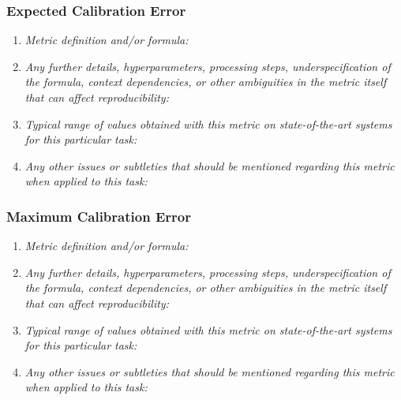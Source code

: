 \documentclass[a4paper,11pt]{article}
\begin{document}
        \subsubsection{Expected Calibration Error}
            \begin{enumerate}[label=\alph*.]
                \item \textit{Metric definition and/or formula:}
                \bigskip
                \item \textit{Any further details, hyperparameters, processing steps, underspecification of the formula, context dependencies, or other ambiguities in the metric itself that can affect reproducibility:}
                \bigskip
                \item \textit{Typical range of values obtained with this metric on state-of-the-art systems for this particular task:}
                \bigskip
                \item \textit{Any other issues or subtleties that should be mentioned regarding this metric when applied to this task:}
                \bigskip
            \end{enumerate}
        \subsubsection{Maximum Calibration Error}
            \begin{enumerate}[label=\alph*.]
                \item \textit{Metric definition and/or formula:}
                \bigskip
                \item \textit{Any further details, hyperparameters, processing steps, underspecification of the formula, context dependencies, or other ambiguities in the metric itself that can affect reproducibility:}
                \bigskip
                \item \textit{Typical range of values obtained with this metric on state-of-the-art systems for this particular task:}
                \bigskip
                \item \textit{Any other issues or subtleties that should be mentioned regarding this metric when applied to this task:}
                \bigskip
            \end{enumerate}
\end{document}
